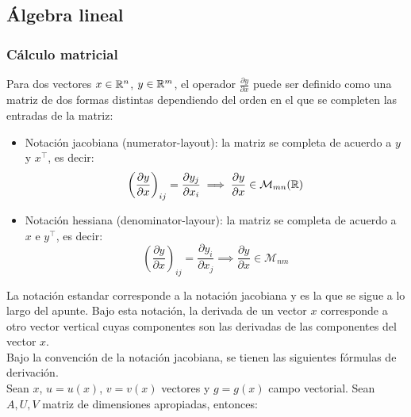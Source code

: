 \subsection{Álgebra lineal}

\subsubsection{Cálculo matricial}

Para dos vectores $x\in\mathbb{R}^n$, $y\in\mathbb{R}^m$, el operador $\frac{\partial y}{\partial x}$ puede ser definido como una matriz de dos formas distintas dependiendo del orden en el que se completen las entradas de la matriz:

\begin{itemize}
	\item Notación jacobiana (numerator-layout): la matriz se completa de acuerdo a $y$ y $x^\top $, es decir:
	\begin{equation*}
		\left(\frac{\partial y}{\partial x}\right)_{ij} = \frac{\partial y_j}{\partial x_i} \implies \frac{\partial y}{\partial x}\in \mathcal{M}_{mn}(\mathbb{R})
	\end{equation*}
	
	\item Notación hessiana (denominator-layour): la matriz se completa de acuerdo a $x$ e $y^\top $, es decir:
	\begin{equation*}
		\left(\frac{\partial y}{\partial x}\right)_{ij} = \frac{\partial y_i}{\partial x_j} \implies \frac{\partial y}{\partial x}\in \mathcal{M}_{nm}
	\end{equation*}
	
\end{itemize}


La notación estandar corresponde a la notación jacobiana y es la que se sigue a lo largo del apunte. Bajo esta notación, la derivada de un vector $x$ corresponde a otro vector vertical cuyas componentes son las derivadas de las componentes del vector $x$.\\

Bajo la convención de la notación jacobiana, se tienen las siguientes fórmulas de derivación.\\

Sean $x$, $u=u(x)$, $v=v(x)$ vectores y $g=g(x)$ campo vectorial. Sean $A,U,V$ matriz de dimensiones apropiadas, entonces:

